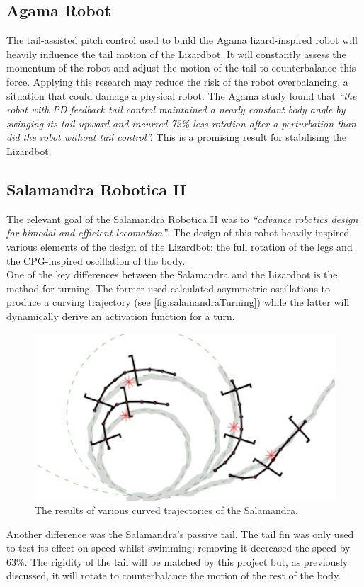\documentclass{article}
\begin{document}
\subsection{Agama Robot}
\label{sec:Agama Robot}
The tail-assisted pitch control used to build the Agama lizard-inspired robot will heavily influence the tail motion of the Lizardbot.  It will constantly assess the momentum of the robot and adjust the motion of the tail to counterbalance this force. Applying this research may reduce the risk of the robot overbalancing, a situation that could damage a physical robot. The Agama study found that \textit{“the robot with PD feedback tail control maintained a nearly constant body angle by swinging its tail upward and incurred 72\% less rotation after a perturbation than did the robot without tail control”.} This is a promising result for stabilising the Lizardbot.

\subsection{Salamandra Robotica II}
\label{sec:Salamandra Roboticaa II}
The relevant goal of the Salamandra Robotica II  was to \textit{“advance robotics design for bimodal and efficient locomotion”}. The design of this robot heavily inspired various elements of the design of the Lizardbot: the full rotation of the legs and the CPG-inspired oscillation of the body. \\
One of the key differences between the Salamandra and the Lizardbot is the method for turning. The former used calculated asymmetric oscillations to produce a curving trajectory (see \autoref{fig:salamandraTurning}) while the latter will dynamically derive an activation function for a turn. \\
\begin{figure}[H]
\centering
\includegraphics[scale=0.7]{salamandraTurning}
\caption{The results of various curved trajectories of the Salamandra. \citep{salamandra}}
\label{fig:salamandraTurning}
\end{figure}
Another difference was the Salamandra’s passive tail. The tail fin was only used to test its effect on speed whilst swimming; removing it decreased the speed by 63\%. The rigidity of the tail will be matched by this project but, as previously discussed, it will rotate to counterbalance the motion of the rest of the body.
\end{document}
